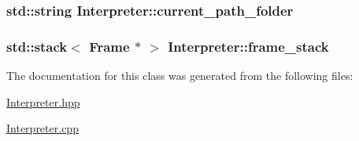 \subsubsection[{\texorpdfstring{current\+\_\+path\+\_\+folder}{current_path_folder}}]{\setlength{\rightskip}{0pt plus 5cm}std\+::string Interpreter\+::current\+\_\+path\+\_\+folder}\hypertarget{class_interpreter_aba201f836cc30ebda2cdab362e00a145}{}\label{class_interpreter_aba201f836cc30ebda2cdab362e00a145}
\subsubsection[{\texorpdfstring{frame\+\_\+stack}{frame_stack}}]{\setlength{\rightskip}{0pt plus 5cm}std\+::stack$<$ {\bf Frame} $\ast$ $>$ Interpreter\+::frame\+\_\+stack\hspace{0.3cm}{\ttfamily [static]}}\hypertarget{class_interpreter_a58a07f0f8a916fdca9cd97fb220c55dc}{}\label{class_interpreter_a58a07f0f8a916fdca9cd97fb220c55dc}


The documentation for this class was generated from the following files\+:\begin{DoxyCompactItemize}
\item 
\hyperlink{_interpreter_8hpp}{Interpreter.\+hpp}\item 
\hyperlink{_interpreter_8cpp}{Interpreter.\+cpp}\end{DoxyCompactItemize}
